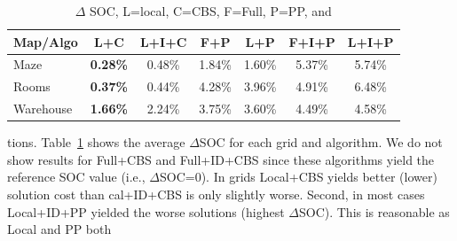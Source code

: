 \documentclass[letterpaper]{article} %
\def\
UrlFont{\rm}  %
\theoremstyle{definition}
\begin{document}
\begin{table}
\centering
\footnotesize
\begin{tabular}{@{}l|cccccc@{}}
\toprule
Map/Algo  & L+C & L+I+C & F+P & L+P & F+I+P & L+I+P \\ \midrule
Maze      & \textbf{0.28\%} & 0.48\%     & 1.84\%    & 1.60\%     & 5.37\%       & 5.74\%       \\
Rooms     & \textbf{0.37\%}  & 0.44\%    & 4.28\%    & 3.96\%     & 4.91\%       & 6.48\%        \\
Warehouse & \textbf{1.66\%}  & 2.24\%    & 3.75\%    & 3.60\%     & 4.49\%       & 4.58\%        \\ \bottomrule
\end{tabular}
    \caption{$\Delta$ SOC, L=local, C=CBS, F=Full, P=PP, and }
    \label{tab:delta-soc}
\end{table}

 tions.
Table~\ref{tab:delta-soc} shows the average $\Delta$SOC for each grid and algorithm. We do not show results for Full+CBS and Full+ID+CBS since these algorithms yield the reference SOC value (i.e., $\Delta$SOC=0).
In  grids Local+CBS yields better (lower) solution cost than  cal+ID+CBS is only slightly worse.
Second, in most cases Local+ID+PP yielded the worse solutions (highest $\Delta$SOC). This is reasonable as Local and PP both  

\end{document}
